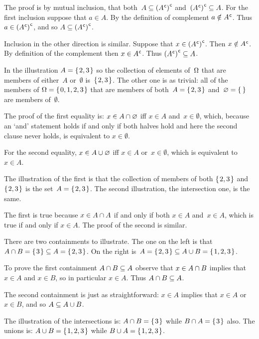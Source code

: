 \documentclass{test}  %
\begin{document}
\begin{ex}
\begin{ans}
\begin{items}
  The proof 
  is by mutual inclusion, that both~$A\subseteq{({A}^{\mspace{1mu}\mathsf{c}})}^{\mspace{1mu}\mathsf{c}}$
  and~${({A}^{\mspace{1mu}\mathsf{c}})}^{\mspace{1mu}\mathsf{c}}\subseteq A$.
  For the first inclusion suppose that $a\in A$.
  By the definition of complement $a\notin{A}^{\mspace{1mu}\mathsf{c}}$.
  Thus $a\in{({A}^{\mspace{1mu}\mathsf{c}})}^{\mspace{1mu}\mathsf{c}}$,
  and so $A\subseteq{({A}^{\mspace{1mu}\mathsf{c}})}^{\mspace{1mu}\mathsf{c}}$.

  Inclusion in the other direction is similar.
  Suppose that $x\in{({A}^{\mspace{1mu}\mathsf{c}})}^{\mspace{1mu}\mathsf{c}}$.
  Then $x\notin{A}^{\mspace{1mu}\mathsf{c}}$.
  By definition of the complement then $x\in{A}^{\mspace{1mu}\mathsf{c}}$.
  Thus ${({A}^{\mspace{1mu}\mathsf{c}})}^{\mspace{1mu}\mathsf{c}}\subseteq A$. 
\item In the illustration $A=\mbox{$\{\hspace{0.1em}2,3\hspace{0.1em}\}$}$ so the collection of
  elements of~$\Omega$ that are members of either~$A$ or~$\emptyset$
  is~$\mbox{$\{\hspace{0.1em}2,3\hspace{0.1em}\}$}$.
  The other one is as trivial: all of the members of 
  $\Omega=\mbox{$\{\hspace{0.1em}0,1,2,3\hspace{0.1em}\}$}$ that are members of both~$A=\mbox{$\{\hspace{0.1em}2,3\hspace{0.1em}\}$}$
  and~$\emptyset=\set{}$ are members of~$\emptyset$.

  The proof of the first equality is: $x\in A\cap\varnothing$
  iff $x\in A$ and~$x\in\emptyset$, 
  which, because an `and' statement holds if and only if both halves hold
  and here the second clause never holds,
  is equivalent to $x\in\emptyset$. 

  For the second equality, 
  $x\in A\cup\varnothing$ iff $x\in A$ or~$x\in\emptyset$,
  which is equivalent to $x\in A$.
\item The illustration of the first is that the collection of members of both
  $\mbox{$\{\hspace{0.1em}2,3\hspace{0.1em}\}$}$ and~$\mbox{$\{\hspace{0.1em}2,3\hspace{0.1em}\}$}$ is the set~$A=\mbox{$\{\hspace{0.1em}2,3\hspace{0.1em}\}$}$.
  The second illustration, the intersection one, is the same.

  The first is true because
  $x\in A\cap A$ if and only if
  both $x\in A$ and~$x\in A$, 
  which is true if and only if $x\in A$.
  The proof of the second is similar.
\item There are two containments to illustrate.
  The one on the left is that $A\cap B=\mbox{$\{\hspace{0.1em}3\hspace{0.1em}\}$}\subseteq A=\mbox{$\{\hspace{0.1em}2,3\hspace{0.1em}\}$}$.
  On the right is~$A=\mbox{$\{\hspace{0.1em}2,3\hspace{0.1em}\}$}\subseteq A\cup B=\mbox{$\{\hspace{0.1em}1,2,3\hspace{0.1em}\}$}$.

  To prove the first containment $A\cap B\subseteq A$ observe that 
  $x\in A\cap B$ implies that
  $x\in A$ and $x\in B$, so in particular $x\in A$.
  Thus $A\cap B\subseteq A$.

  The second containment is just as straightforward:
  $x\in A$ implies that $x\in A$ or~$x\in B$, and so $A\subseteq A\cup B$.
\item The illustration of the intersections is: $A\cap B=\mbox{$\{\hspace{0.1em}3\hspace{0.1em}\}$}$
  while $B\cap A=\mbox{$\{\hspace{0.1em}3\hspace{0.1em}\}$}$ also.
  The unions is: $A\cup B=\mbox{$\{\hspace{0.1em}1,2,3\hspace{0.1em}\}$}$ while $B\cup A=\mbox{$\{\hspace{0.1em}1,2,3\hspace{0.1em}\}$}$.


\end{items}
\end{ans}
\end{ex}
\end{document}
